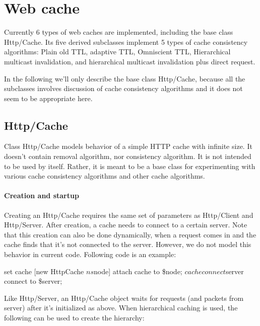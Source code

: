 \section{Web cache}
\label{sec:webcache-cache}

Currently 6 types of web caches are implemented, including 
the base class Http/Cache. Its five derived subclasses 
implement 5 types of cache consistency algorithms: Plain old TTL, 
adaptive TTL, Omniscient TTL, Hierarchical multicast invalidation, 
and hierarchical multicast invalidation plus direct request.

In the following we'll only describe the base class Http/Cache, because 
all the subclasses involves discussion of cache consistency algorithms 
and it does not seem to be appropriate here.

\subsection{Http/Cache}
\label{sec:webcache-cache-base}

Class Http/Cache models behavior of a simple HTTP cache with infinite 
size. It doesn't contain removal algorithm, nor consistency algorithm. 
It is not intended to be used by itself. Rather, it is meant to be a 
base class for experimenting with various cache consistency algorithms and
other cache algorithms. 

\paragraph{Creation and startup}

Creating an Http/Cache requires the same set of parameters as
Http/Client and Http/Server. After creation, a cache needs to connect 
to a certain server. Note that this creation can also be done dynamically,
when a request comes in and the cache finds that it's not connected to 
the server. However, we do not model this behavior in current code.
Following code is an example:

\begin{program}
        set cache [new HttpCache $ns $node] \; attach cache to \$node;
        $cache connect $server \; connect to \$server;
\end{program}

Like Http/Server, an Http/Cache object waits for requests (and packets
from server) after it's initialized as above. When hierarchical
caching is used, the following can be used to create the hierarchy:

